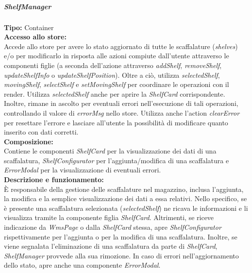 \subparagraph{\colorbox{verde_uml}{ShelfManager}}
\textbf{Tipo:} Container \\
\textbf{Accesso allo store:} \\
Accede allo store per avere lo stato aggiornato di tutte le scaffalature (\textit{shelves}) e/o per modificarlo in risposta alle azioni compiute dall'utente attraverso le componenti figlie (a seconda dell'azione attraverso \textit{addShelf}, \textit{removeShelf}, \textit{updateShelfInfo} o \textit{updateShelfPosition}). Oltre a ciò, utilizza \textit{selectedShelf}, \textit{movingShelf}, \textit{selectShelf} e \textit{setMovingShelf} per coordinare le operazioni con il render. Utilizza \textit{selectedShelf} anche per aprire la \textit{ShelfCard} corrispondente. Inoltre, rimane in ascolto per eventuali errori nell'esecuzione di tali operazioni, controllando il valore di \textit{errorMsg} nello store. Utilizza anche l'action \textit{clearError} per resettare l'errore e lasciare all'utente la possibilità di modificare quanto inserito con dati corretti.
\\
\textbf{Composizione:} \\
Contiene le componenti \textit{ShelfCard} per la visualizzazione dei dati di una scaffalatura, \textit{ShelfConfigurator} per l'aggiunta/modifica di una scaffalatura e \textit{ErrorModal} per la visualizzazione di eventuali errori.
\\
\textbf{Descrizione e funzionamento:} \\
È responsabile della gestione delle scaffalature nel magazzino, inclusa l'aggiunta, la modifica e la semplice visualizzazione dei dati a essa relativi. 
Nello specifico, se è presente una scaffalatura selezionata (\textit{selectedShelf}) ne ricava le informazioni e li visualizza tramite la componente figlia \textit{ShelfCard}. Altrimenti, se riceve indicazione da \textit{WmsPage} o dalla \textit{ShelfCard} stessa, apre \textit{ShelfConfigurator} rispettivamente per l'aggiunta o per la modifica di una scaffalatura.  Inoltre, se viene segnalata l'eliminazione di una scaffalatura da parte di \textit{ShelfCard}, \textit{ShelfManager} provvede alla sua rimozione.
In caso di errori nell'aggiornamento dello stato, apre anche una componente \textit{ErrorModal}.

